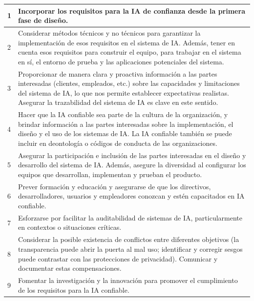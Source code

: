 \documentclass[10pt]{article}
\begin{document}
\vspace{0.5cm}
        \begin{tabularx}{0.8\textwidth} { |p{1cm}| m{11cm} |}
        \hline
        {1} &{Incorporar los requisitos para la IA de conﬁanza desde la primera fase de diseño.} 
        \\
        \hline
        {2} & {Considerar métodos técnicos y no técnicos para garantizar la implementación de esos requisitos en el sistema de IA. Además, tener en cuenta esos requisitos para construir el equipo, para trabajar en el sistema en sí, el entorno de prueba y las aplicaciones potenciales del sistema.} \\ 
        \hline                            
        {3} & {Proporcionar de manera clara y proactiva información a las partes interesadas (clientes, empleados, etc.) sobre     las capacidades y limitaciones del sistema de IA, lo que nos permite establecer expectativas realistas. Asegurar la trazabilidad del sistema de IA es clave en este sentido.} \\ 
        \hline
        {4} & {Hacer que la IA conﬁable sea parte de la cultura de la organización, y brindar información a las partes interesadas sobre la implementación, el diseño y el uso de los sistemas de IA. La IA conﬁable también se puede incluir en deontología o códigos de conducta de las organizaciones.} \\ 
        \hline
        {5} & {Asegurar la participación e inclusión de las partes interesadas en el diseño y desarrollo del sistema de IA. Además, asegure la diversidad al conﬁgurar los equipos que desarrollan, implementan y prueban el producto.}  \\
        \hline
        {6} & {Prever formación y educación y asegurarse de que los directivos, desarrolladores, usuarios y empleadores conozcan y estén capacitados en IA conﬁable.}  \\
        \hline
        {7} & {Esforzarse por facilitar la auditabilidad de sistemas de IA, particularmente en contextos o situaciones críticas.}  \\
        \hline
        {8} & {Considerar la posible existencia de conﬂictos entre             diferentes objetivos (la transparencia puede abrir la puerta al mal uso; identiﬁcar y corregir sesgos puede   contrastar con las protecciones de privacidad). Comunicar y documentar estas compensaciones.}  \\
        \hline
        {9} & {Fomentar la investigación y la innovación para promover el cumplimiento de los requisitos para la IA   conﬁable.}  \\
        \hline
        \end{tabularx} 
        \\
        \caption {\\Tabla 2 : Recomendaciones del High-Level Expert Group on Artiﬁcial Intelligence. Draft Ethics Guidelines for Trust- worthy AI. European Commission}
        \label{tab:2}
\end{document}
